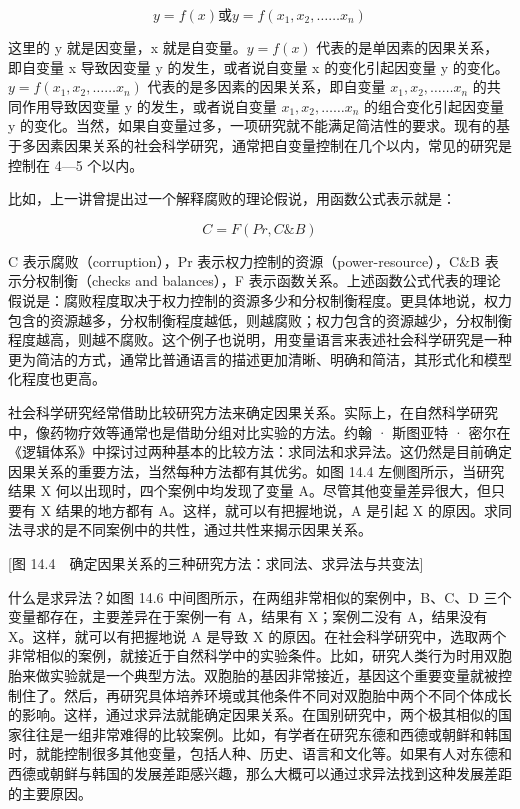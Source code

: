 \[y = f(x) 或 y = f(x_1,x_2,……x_n)\]

这里的 y 就是因变量，x 就是自变量。$y = f(x)$ 代表的是单因素的因果关系，即自变量 x 导致因变量 y 的发生，或者说自变量 x 的变化引起因变量 y 的变化。$y = f(x_1,x_2,……x_n)$ 代表的是多因素的因果关系，即自变量 $x_1,x_2,……x_n$ 的共同作用导致因变量 y 的发生，或者说自变量 $x_1,x_2,……x_n$ 的组合变化引起因变量 y 的变化。当然，如果自变量过多，一项研究就不能满足简洁性的要求。现有的基于多因素因果关系的社会科学研究，通常把自变量控制在几个以内，常见的研究是控制在 4—5 个以内。

比如，上一讲曾提出过一个解释腐败的理论假说，用函数公式表示就是：

\[C = F(Pr, C\&B)\]

C 表示腐败（corruption），Pr 表示权力控制的资源（power-resource），C\&B 表示分权制衡（checks and balances），F 表示函数关系。上述函数公式代表的理论假说是：腐败程度取决于权力控制的资源多少和分权制衡程度。更具体地说，权力包含的资源越多，分权制衡程度越低，则越腐败；权力包含的资源越少，分权制衡程度越高，则越不腐败。这个例子也说明，用变量语言来表述社会科学研究是一种更为简洁的方式，通常比普通语言的描述更加清晰、明确和简洁，其形式化和模型化程度也更高。


社会科学研究经常借助比较研究方法来确定因果关系。实际上，在自然科学研究中，像药物疗效等通常也是借助分组对比实验的方法。约翰 · 斯图亚特 · 密尔在《逻辑体系》中探讨过两种基本的比较方法：求同法和求异法。这仍然是目前确定因果关系的重要方法，当然每种方法都有其优劣。如图 14.4 左侧图所示，当研究结果 X 何以出现时，四个案例中均发现了变量 A。尽管其他变量差异很大，但只要有 X 结果的地方都有 A。这样，就可以有把握地说，A 是引起 X 的原因。求同法寻求的是不同案例中的共性，通过共性来揭示因果关系。

[图 14.4　确定因果关系的三种研究方法：求同法、求异法与共变法]

什么是求异法？如图 14.6 中间图所示，在两组非常相似的案例中，B、C、D 三个变量都存在，主要差异在于案例一有 A，结果有 X；案例二没有 A，结果没有 X。这样，就可以有把握地说 A 是导致 X 的原因。在社会科学研究中，选取两个非常相似的案例，就接近于自然科学中的实验条件。比如，研究人类行为时用双胞胎来做实验就是一个典型方法。双胞胎的基因非常接近，基因这个重要变量就被控制住了。然后，再研究具体培养环境或其他条件不同对双胞胎中两个不同个体成长的影响。这样，通过求异法就能确定因果关系。在国别研究中，两个极其相似的国家往往是一组非常难得的比较案例。比如，有学者在研究东德和西德或朝鲜和韩国时，就能控制很多其他变量，包括人种、历史、语言和文化等。如果有人对东德和西德或朝鲜与韩国的发展差距感兴趣，那么大概可以通过求异法找到这种发展差距的主要原因。

